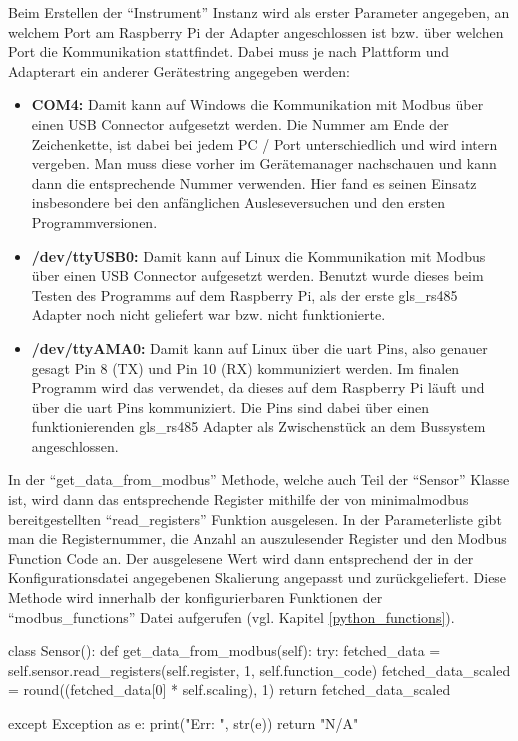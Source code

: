 Beim Erstellen der \enquote{Instrument} Instanz wird als erster Parameter angegeben, an welchem Port am Raspberry Pi der Adapter angeschlossen ist bzw. über welchen Port die Kommunikation stattfindet. Dabei muss je nach Plattform und Adapterart ein anderer Gerätestring angegeben werden:
\begin{itemize}
\item \textbf{COM4:} Damit kann auf Windows die Kommunikation mit Modbus über einen USB Connector aufgesetzt werden. Die Nummer am Ende der Zeichenkette, ist dabei bei jedem PC / Port unterschiedlich und wird intern vergeben. Man muss diese vorher im Gerätemanager nachschauen und kann dann die entsprechende Nummer verwenden. Hier fand es seinen Einsatz insbesondere bei den anfänglichen Ausleseversuchen und den ersten Programmversionen.
\item \textbf{/dev/ttyUSB0:} Damit kann auf Linux die Kommunikation mit Modbus über einen USB Connector aufgesetzt werden. Benutzt wurde dieses beim Testen des Programms auf dem Raspberry Pi, als der erste \gls{gls_rs485} Adapter noch nicht geliefert war bzw. nicht funktionierte.
\item \textbf{/dev/ttyAMA0:} Damit kann auf Linux über die \acf{uart} Pins, also genauer gesagt Pin 8 (TX) und Pin 10 (RX) kommuniziert werden. Im finalen Programm wird das verwendet, da dieses auf dem Raspberry Pi läuft und über die \acs{uart} Pins kommuniziert. Die Pins sind dabei über einen funktionierenden \gls{gls_rs485} Adapter als Zwischenstück an dem Bussystem angeschlossen.
\end{itemize}

\vfill

\label{get_data_from_modbus}
In der \enquote{get\_data\_from\_modbus} Methode, welche auch Teil der \enquote{Sensor} Klasse ist, wird dann das entsprechende Register mithilfe der von minimalmodbus bereitgestellten \enquote{read\_registers} Funktion ausgelesen. In der Parameterliste gibt man die Registernummer, die Anzahl an auszulesender Register und den Modbus Function Code an. Der ausgelesene Wert wird dann entsprechend der in der Konfigurationsdatei angegebenen Skalierung angepasst und zurückgeliefert. Diese Methode wird innerhalb der konfigurierbaren Funktionen der \enquote{modbus\_functions} Datei aufgerufen (vgl. Kapitel \ref{python_functions}).

\begin{pythoncode}
class Sensor():
	def get_data_from_modbus(self):
		try:
			fetched_data = self.sensor.read_registers(self.register, 1, self.function_code)
			fetched_data_scaled = round((fetched_data[0] * self.scaling), 1)
			return fetched_data_scaled
		
		except Exception as e:
			print("Err: ", str(e))
			return "N/A"
\end{pythoncode}

